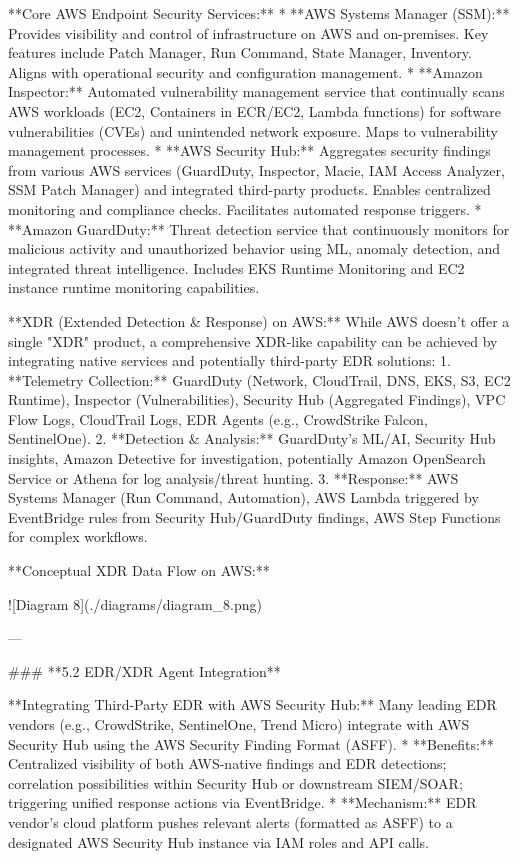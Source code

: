 \documentclass{article}
\begin{document}
**Core AWS Endpoint Security Services:**
* **AWS Systems Manager (SSM):** Provides visibility and control of infrastructure on AWS and on-premises. Key features include Patch Manager, Run Command, State Manager, Inventory. Aligns with operational security and configuration management.
* **Amazon Inspector:** Automated vulnerability management service that continually scans AWS workloads (EC2, Containers in ECR/EC2, Lambda functions) for software vulnerabilities (CVEs) and unintended network exposure. Maps to vulnerability management processes.
* **AWS Security Hub:** Aggregates security findings from various AWS services (GuardDuty, Inspector, Macie, IAM Access Analyzer, SSM Patch Manager) and integrated third-party products. Enables centralized monitoring and compliance checks. Facilitates automated response triggers.
* **Amazon GuardDuty:** Threat detection service that continuously monitors for malicious activity and unauthorized behavior using ML, anomaly detection, and integrated threat intelligence. Includes EKS Runtime Monitoring and EC2 instance runtime monitoring capabilities.

**XDR (Extended Detection & Response) on AWS:**
While AWS doesn't offer a single "XDR" product, a comprehensive XDR-like capability can be achieved by integrating native services and potentially third-party EDR solutions:
1.  **Telemetry Collection:** GuardDuty (Network, CloudTrail, DNS, EKS, S3, EC2 Runtime), Inspector (Vulnerabilities), Security Hub (Aggregated Findings), VPC Flow Logs, CloudTrail Logs, EDR Agents (e.g., CrowdStrike Falcon, SentinelOne).
2.  **Detection & Analysis:** GuardDuty's ML/AI, Security Hub insights, Amazon Detective for investigation, potentially Amazon OpenSearch Service or Athena for log analysis/threat hunting.
3.  **Response:** AWS Systems Manager (Run Command, Automation), AWS Lambda triggered by EventBridge rules from Security Hub/GuardDuty findings, AWS Step Functions for complex workflows.

**Conceptual XDR Data Flow on AWS:**


![Diagram 8](./diagrams/diagram_8.png)



---

### **5.2 EDR/XDR Agent Integration**

**Integrating Third-Party EDR with AWS Security Hub:**
Many leading EDR vendors (e.g., CrowdStrike, SentinelOne, Trend Micro) integrate with AWS Security Hub using the AWS Security Finding Format (ASFF).
* **Benefits:** Centralized visibility of both AWS-native findings and EDR detections; correlation possibilities within Security Hub or downstream SIEM/SOAR; triggering unified response actions via EventBridge.
* **Mechanism:** EDR vendor's cloud platform pushes relevant alerts (formatted as ASFF) to a designated AWS Security Hub instance via IAM roles and API calls.
\end{document}

